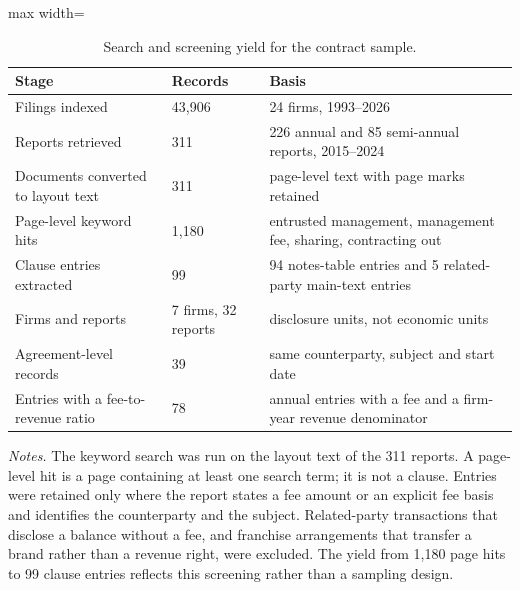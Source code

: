 \documentclass[review,3p,times]{elsarticle}
\begin{document}
\begin{table}[!htbp]
\centering
\renewcommand{\thetable}{A4}
\caption{Search and screening yield for the contract sample.}\label{tab:A4}
\begin{minipage}{\textwidth}
\centering
\footnotesize
\begin{adjustbox}{max width=\textwidth}
\begin{tabular}{@{}lll@{}}
\toprule
Stage & Records & Basis \\
\midrule
Filings indexed & 43,906 & 24 firms, 1993--2026 \\
Reports retrieved & 311 & 226 annual and 85 semi-annual reports, 2015--2024 \\
Documents converted to layout text & 311 & page-level text with page marks retained \\
Page-level keyword hits & 1,180 & entrusted management, management fee, sharing, contracting out \\
Clause entries extracted & 99 & 94 notes-table entries and 5 related-party main-text entries \\
Firms and reports & 7 firms, 32 reports & disclosure units, not economic units \\
Agreement-level records & 39 & same counterparty, subject and start date \\
Entries with a fee-to-revenue ratio & 78 & annual entries with a fee and a firm-year revenue denominator \\
\bottomrule
\end{tabular}
\end{adjustbox}
\par\medskip
\raggedright
\noindent\textit{Notes.} The keyword search was run on the layout text of the 311 reports. A page-level hit is a page containing at least one search term; it is not a clause. Entries were retained only where the report states a fee amount or an explicit fee basis and identifies the counterparty and the subject. Related-party transactions that disclose a balance without a fee, and franchise arrangements that transfer a brand rather than a revenue right, were excluded. The yield from 1,180 page hits to 99 clause entries reflects this screening rather than a sampling design.
\end{minipage}
\end{table}
\end{document}
